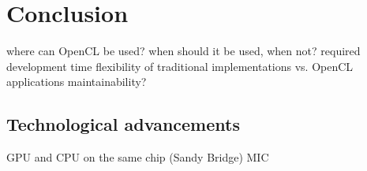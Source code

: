 \section{Conclusion}

where can OpenCL be used?
when should it be used, when not?
required development time
flexibility of traditional implementations vs. OpenCL applications
maintainability?

\subsection{Technological advancements}
GPU and CPU on the same chip (Sandy Bridge)
MIC